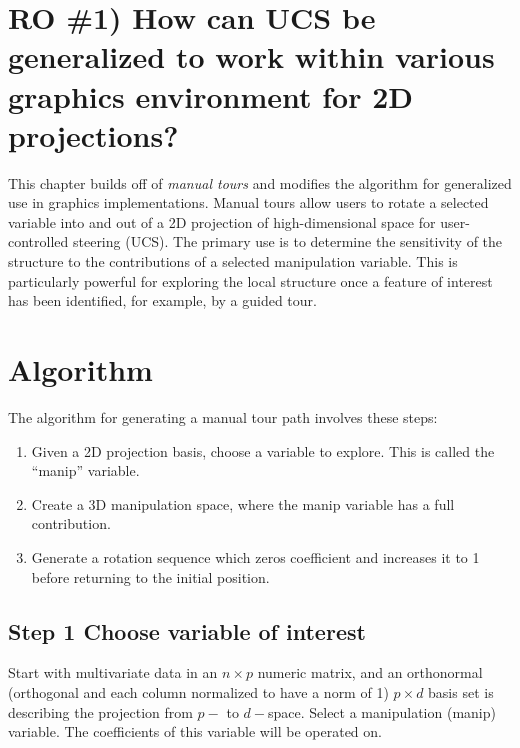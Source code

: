\documentclass{monashthesis}
\begin{document}
\section{RO \#1) How can UCS be generalized to work within various
graphics environment for 2D
projections?}\label{ro-1-how-can-ucs-be-generalized-to-work-within-various-graphics-environment-for-2d-projections}

This chapter builds off of \emph{manual tours}
\autocite{cook_manual_1997} and modifies the algorithm for generalized
use in graphics implementations. Manual tours allow users to rotate a
selected variable into and out of a 2D projection of high-dimensional
space for user-controlled steering (UCS). The primary use is to
determine the sensitivity of the structure to the contributions of a
selected manipulation variable. This is particularly powerful for
exploring the local structure once a feature of interest has been
identified, for example, by a guided tour.

\section{Algorithm}\label{sec:algorithm}

The algorithm for generating a manual tour path involves these steps:

\begin{enumerate}
\def\labelenumi{\arabic{enumi}.}
\tightlist
\item
  Given a 2D projection basis, choose a variable to explore. This is
  called the ``manip'' variable.
\item
  Create a 3D manipulation space, where the manip variable has a full
  contribution.
\item
  Generate a rotation sequence which zeros coefficient and increases it
  to 1 before returning to the initial position.
\end{enumerate}

\subsection{Step 1 Choose variable of
interest}\label{step-1-choose-variable-of-interest}

Start with multivariate data in an \(n \times p\) numeric matrix, and an
orthonormal (orthogonal and each column normalized to have a norm of 1)
\(p \times d\) basis set is describing the projection from \(p-\) to
\(d-\)space. Select a manipulation (manip) variable. The coefficients of
this variable will be operated on.
\end{document}
